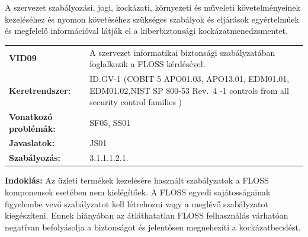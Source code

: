 \documentclass[12pt,magyar,a4paper,oneside]{scrreprt}
\begin{document}
A szervezet szabályozási, jogi, kockázati, környezeti és műveleti
követelményeinek kezeléséhez és nyomon követéséhez szükséges szabályok
és eljárások egyértelműek és megfelelő információval látják el a
kiberbiztonsági kockázatmenedzsmentet.

\begin{longtable}[]{@{}ll@{}}
\toprule
\endhead
\begin{minipage}[t]{0.16\columnwidth}\raggedright
\textbf{VID09}\strut
\end{minipage} & \begin{minipage}[t]{0.79\columnwidth}\raggedright
A szervezet informatikai biztonsági szabályzatában foglalkozik a FLOSS
kérdésével.\strut
\end{minipage}\tabularnewline
\begin{minipage}[t]{0.16\columnwidth}\raggedright
\textbf{Keretrendszer:}\strut
\end{minipage} & \begin{minipage}[t]{0.79\columnwidth}\raggedright
ID.GV-1 (COBIT 5 APO01.03, APO13.01, EDM01.01, EDM01.02,NIST SP 800-53
Rev.~4 -1 controls from all security control families )\strut
\end{minipage}\tabularnewline
\begin{minipage}[t]{0.16\columnwidth}\raggedright
\textbf{Vonatkozó problémák:}\strut
\end{minipage} & \begin{minipage}[t]{0.79\columnwidth}\raggedright
SF05, SS01\strut
\end{minipage}\tabularnewline
\begin{minipage}[t]{0.16\columnwidth}\raggedright
\textbf{Javaslatok:}\strut
\end{minipage} & \begin{minipage}[t]{0.79\columnwidth}\raggedright
JS01\strut
\end{minipage}\tabularnewline
\begin{minipage}[t]{0.16\columnwidth}\raggedright
\textbf{Szabályozás:}\strut
\end{minipage} & \begin{minipage}[t]{0.79\columnwidth}\raggedright
3.1.1.1.2.1.\strut
\end{minipage}\tabularnewline
\bottomrule
\end{longtable}

\textbf{Indoklás: } Az üzleti termékek kezelésére használt szabályzatok
a FLOSS komponensek esetében nem kielégítőek. A FLOSS egyedi
sajátosságainak figyelembe vevő szabályzatot kell létrehozni vagy a
meglévő szabályzatot kiegészíteni. Ennek hiányában az átláthatatlan
FLOSS felhasználás várhatóan negatívan befolyásolja a biztonságot és
jelentősen megnehezíti a kockázatbecslést.
\end{document}
